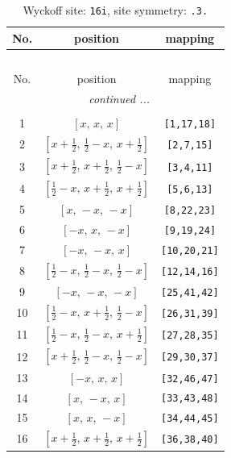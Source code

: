\documentclass[fleqn,8pt]{jsarticle}
\begin{document}
\begin{longtable}{ccc}
\caption{Wyckoff site: {\tt 16i}, site symmetry: {\tt .3.}}
 \\
 \hline \hline
No. & position & mapping \\ \hline \endfirsthead

\multicolumn{2}{l}{\tablename\ \thetable{}} \\
 \hline \hline
No. & position & mapping \\ \hline \endhead

 \hline \hline
\multicolumn{2}{r}{\footnotesize\it continued ...} \\ \endfoot

 \hline \hline
\multicolumn{2}{r}{} \\ \endlastfoot

1 & $\left[ x,\, x,\, x \right]$ & {\tt [1,17,18]} \\ \hline
2 & $\left[ x + \frac{1}{2},\, \frac{1}{2} - x,\, x + \frac{1}{2} \right]$ & {\tt [2,7,15]} \\ \hline
3 & $\left[ x + \frac{1}{2},\, x + \frac{1}{2},\, \frac{1}{2} - x \right]$ & {\tt [3,4,11]} \\ \hline
4 & $\left[ \frac{1}{2} - x,\, x + \frac{1}{2},\, x + \frac{1}{2} \right]$ & {\tt [5,6,13]} \\ \hline
5 & $\left[ x,\, - x,\, - x \right]$ & {\tt [8,22,23]} \\ \hline
6 & $\left[ - x,\, x,\, - x \right]$ & {\tt [9,19,24]} \\ \hline
7 & $\left[ - x,\, - x,\, x \right]$ & {\tt [10,20,21]} \\ \hline
8 & $\left[ \frac{1}{2} - x,\, \frac{1}{2} - x,\, \frac{1}{2} - x \right]$ & {\tt [12,14,16]} \\ \hline
9 & $\left[ - x,\, - x,\, - x \right]$ & {\tt [25,41,42]} \\ \hline
10 & $\left[ \frac{1}{2} - x,\, x + \frac{1}{2},\, \frac{1}{2} - x \right]$ & {\tt [26,31,39]} \\ \hline
11 & $\left[ \frac{1}{2} - x,\, \frac{1}{2} - x,\, x + \frac{1}{2} \right]$ & {\tt [27,28,35]} \\ \hline
12 & $\left[ x + \frac{1}{2},\, \frac{1}{2} - x,\, \frac{1}{2} - x \right]$ & {\tt [29,30,37]} \\ \hline
13 & $\left[ - x,\, x,\, x \right]$ & {\tt [32,46,47]} \\ \hline
14 & $\left[ x,\, - x,\, x \right]$ & {\tt [33,43,48]} \\ \hline
15 & $\left[ x,\, x,\, - x \right]$ & {\tt [34,44,45]} \\ \hline
16 & $\left[ x + \frac{1}{2},\, x + \frac{1}{2},\, x + \frac{1}{2} \right]$ & {\tt [36,38,40]} \\
\end{longtable}
\end{document}
